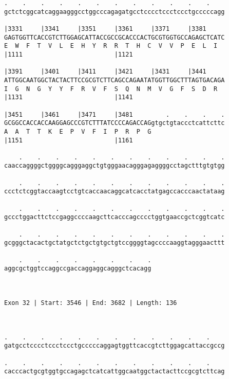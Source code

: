 \documentclass{article}
\begin{document}
\begin{Verbatim}
.    .    .    .    .    .    .    .    .    .    .    .    
gctctcggcatcaggaagggcctggcccagagatgcctcccctccctccctgcccccagg
                                                            
|3331     |3341     |3351     |3361     |3371     |3381     
GAGTGGTTCACCGTCTTGGAGCATTACCGCCGCACCCACTGCGTGGTGCCAGAGCTCATC
E  W  F  T  V  L  E  H  Y  R  R  T  H  C  V  V  P  E  L  I  
|1111                         |1121                         
  
|3391     |3401     |3411     |3421     |3431     |3441     
ATTGGCAATGGCTACTACTTCCGCGTCTTCAGCCAGAATATGGTTGGCTTTAGTGACAGA
I  G  N  G  Y  Y  F  R  V  F  S  Q  N  M  V  G  F  S  D  R  
|1131                         |1141                         
  
|3451     |3461     |3471     |3481         .    .    .    .
GCGGCCACCACCAAGGAGCCCGTCTTTATCCCCAGACCAGgtgctgtaccctcattcttc
A  A  T  T  K  E  P  V  F  I  P  R  P  G                    
|1151                         |1161                         
  
    .    .    .    .    .    .    .    .    .    .    .    .
caaccaggggctggggcagggaggctgtgggaacagggagaggggcctagctttgtgtgg
                                                            
    .    .    .    .    .    .    .    .    .    .    .    .
ccctctcggtaccaagtcctgtcaccaacaggcatcacctatgagccacccaactataag
                                                            
    .    .    .    .    .    .    .    .    .    .    .    .
gccctggacttctccgaggccccaagcttcacccagcccctggtgaaccgctcggtcatc
                                                            
    .    .    .    .    .    .    .    .    .    .    .    .
gcgggctacactgctatgctctgctgtgctgtccggggtagccccaaggtagggaacttt
                                                            
    .    .    .    .    .    .    .    .
aggcgctggtccaggccgaccaggaggcagggctcacagg
                                        
                                        
 
Exon 32 | Start: 3546 | End: 3682 | Length: 136



.    .    .    .    .    .    .    .    .    .    .    .    
gatgcctcccctccctccctgcccccaggagtggttcaccgtcttggagcattaccgccg
                                                            
.    .    .    .    .    .    .    .    .    .    .    .    
cacccactgcgtggtgccagagctcatcattggcaatggctactacttccgcgtcttcag
                                                            

\end{Verbatim}
\end{document}
